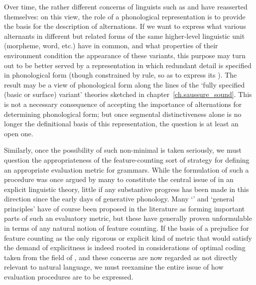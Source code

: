 \largerpage
Over time, the rather different concerns of linguists such as 
{\DeCourtenay} and {\Kruszewski} have reasserted themselves: on this view,
the role of a phonological representation is to provide the basis for
the description of alternations. If we want to express what various
alternants in different but related forms of the same higher-level
linguistic unit (morpheme, word, etc.) have in common, and what
properties of their environment condition the appearance of these
variants, this purpose may turn out to be better served by a
representation in which redundant detail is specified in phonological
form (though constrained by rule, so as to express its
). The result may be a view of phonological form along
the lines of the `fully specified (basic or surface) variant' theories
sketched in chapter~\ref{ch.saussure_sound}. This is not a necessary
consequence of accepting the importance of alternations for
determining phonological form; but once segmental distinctiveness
alone is no longer the definitional basis of this representation, the
question is at least an open one.

Similarly, once the possibility of such non-minimal  is
taken seriously, we must question the appropriateness of the
feature-counting sort of strategy for defining an appropriate
evaluation metric for grammars. While the formulation of such a
procedure was once argued by many to constitute the central issue of
 in an explicit linguistic theory, little if any
substantive progress has been made in this direction since the early
days of generative phonology. Many `' and `general
principles' have of course been proposed in the literature as forming
important parts of such an evaluatory metric, but these have generally
proven unformulable in terms of any natural notion of feature
counting. If the basis of a prejudice for feature counting as the only
rigorous or explicit kind of metric that would satisfy the demand of
explicitness is indeed rooted in considerations of optimal coding
taken from the field of , and these concerns are now
regarded as not directly relevant to natural language, we must
reexamine the entire issue of how evaluation procedures are to be
expressed.

